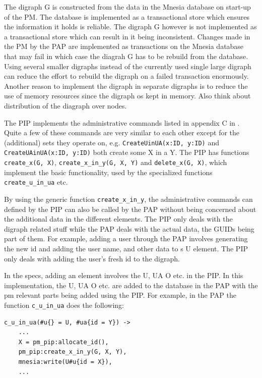 \documentclass[12pt,a4paper,titlepage]{book}
\begin{document}
	The digraph G is constructed from the data in the Mnesia database on start-up of the PM. The database is implemented as a transactional store which ensures the information it holds is reliable. The digraph G however is not implemented as a transactional store which can result in it being inconsistent. Changes made in the PM by the PAP are implemented as transactions on the Mnesia database that may fail in which case the diagrah G has to be rebuild from the database. Using several smaller digraphs instead of the currently used single large digraph can reduce the effort to rebuild the digraph on a failed transaction enormously.
	Another reason to implement the digraph in separate digraphs is to reduce the use of memory resources since the digraph os kept in memory. Also think about distribution of the diagraph over nodes.
	
	The PIP implements the administrative commands listed in appendix C in \cite{NISTIR-7987-REV-1}. Quite a few of these commands are very similar to each other except for the (additional) sets they operate on, e.g. \lstinline|CreateUinUA(x:ID, y:ID)| and \lstinline|CreateUAinUA(x:ID, y:ID)| both create some X in a Y.
	The PIP has functions \lstinline|create_x(G, X)|, \lstinline|create_x_in_y(G, X, Y)| and \lstinline|delete_x(G, X)|,  which implement the basic functionality, used by the specialized functions \lstinline|create_u_in_ua| etc.
	
	By using the generic function \lstinline|create_x_in_y|, the administrative commands can defined by the PIP can also be called by the PAP without being concerned about the additional data in the different elements. The PIP only deals with the digraph related stuff while the PAP deals with the actual data, the GUIDs being part of them. For example, adding a user through the PAP involves generating the new id and adding the user name, and other data to s U element. The PIP only deals with adding the user's fresh id to the digraph.
	
	In the specs, adding an element involves the U, UA O etc. in the PIP. In this implementation, the U, UA O etc. are added to the database in the PAP with the pm relevant parts being added using the PIP. For example, in the PAP the function \lstinline|c_u_in_ua| does the following:
	
	\begin{lstlisting}
c_u_in_ua(#u{} = U, #ua{id = Y}) ->
    ...
    X = pm_pip:allocate_id(),
    pm_pip:create_x_in_y(G, X, Y),
    mnesia:write(U#u{id = X}),
    ...\end{lstlisting}
	
\end{document}
